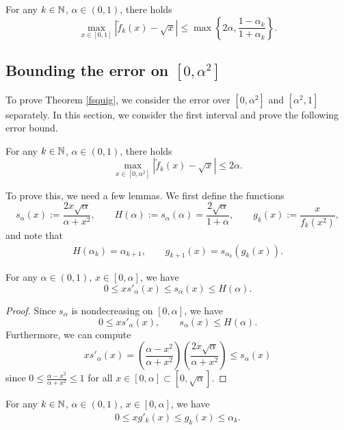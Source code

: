 \begin{appendices}
\begin{thm}\label{fsquig}
For any $k \in \mathbb{N}$, $\alpha \in (0,1)$, there holds
\[\max_{x\in[0,1]}|\tilde{f}_k(x)-\sqrt{x}| \leq \max\left\{2\alpha,\dfrac{1-\alpha_k}{1+\alpha_k}\right\}.\]
\end{thm}

\subsection{Bounding the error on \texorpdfstring{$[0,\alpha^2]$}{[0,a2]}}

To prove Theorem \ref{fsquig}, we consider the error over $[0,\alpha^2]$ and $[\alpha^2,1]$ separately. In this section, we consider the first interval and prove the following error bound.

\begin{thm}\label{0bound}
For any $k \in \mathbb{N}$, $\alpha \in (0,1)$, there holds
\[\max_{x\in [0,\alpha^2]}|\tilde{f}_k(x)-\sqrt{x}|\leq 2\alpha.\]
\end{thm}

To prove this, we need a few lemmas. We first define the functions
\[s_\alpha(x):= \dfrac{2x\sqrt{\alpha}}{\alpha+x^2}, \qquad H(\alpha):= s_\alpha(\alpha) = \dfrac{2\sqrt{\alpha}}{1+\alpha}, \qquad g_k(x):= \dfrac{x}{f_k(x^2)},\]
and note that
\begin{align}
    H(\alpha_k)=\alpha_{k+1}, \qquad g_{k+1}(x) = s_{\alpha_k}(g_k(x)). \label{geekay}
\end{align}

\begin{lemma}\label{A3}
For any $\alpha \in (0,1)$, $x \in [0,\alpha]$, we have
\[0 \leq x s'_\alpha(x) \leq s_\alpha(x) \leq H(\alpha).\]
\end{lemma}

\begin{proof}
Since $s_\alpha$ is nondecreasing on $[0,\alpha]$, we have 
\[0\leq xs'_\alpha(x), \qquad s_\alpha(x) \leq H(\alpha).\]
Furthermore, we can compute
\[xs'_\alpha(x) = \left(\dfrac{\alpha-x^2}{\alpha+x^2}\right)\left(\dfrac{2x\sqrt{\alpha}}{\alpha+x^2}\right)\leq s_\alpha(x)\]
since $0\leq \frac{\alpha-x^2}{\alpha+x^2}\leq 1$ for all $x \in [0,\alpha] \subset [0,\sqrt{\alpha}]$. 
\end{proof}

\begin{lemma} \label{ggkk}
For any $k \in \mathbb{N}$, $\alpha \in (0,1)$, $x \in [0,\alpha]$, we have
\begin{align}
    0 \leq x g'_k(x) \leq g_k(x) \leq \alpha_k.\label{lem2}
\end{align}
\end{lemma}


\end{appendices}

